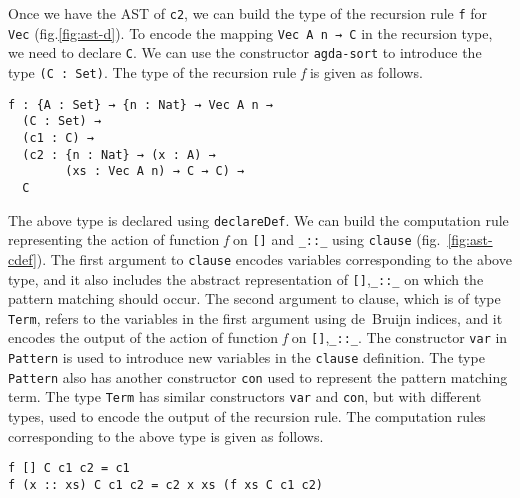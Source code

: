 \documentclass[sigplan,10pt]{acmart}
\begin{document}
Once we have the AST of {\tt c2}, we can build the type of the recursion rule {\tt f} for {\tt Vec} (fig.\ref{fig:ast-d}). To encode the mapping {\tt Vec A n → C} in the recursion type, we need to declare {\tt C}. We can use the constructor {\tt agda-sort} to introduce the type {\tt (C : Set)}. The type of the recursion rule \emph{f} is given as follows.

\begin{center}
\begingroup
\begin{BVerbatim}
f : {A : Set} → {n : Nat} → Vec A n → 
  (C : Set) → 
  (c1 : C) → 
  (c2 : {n : Nat} → (x : A) → 
        (xs : Vec A n) → C → C) → 
  C
\end{BVerbatim}
\endgroup
\end{center}

\normalsize


The above type is declared using {\tt declareDef}. We can build the computation rule representing the action of function \emph{f} on {\tt []} and {\tt \_::\_} using {\tt clause} (fig.~\ref{fig:ast-cdef}). The first argument to {\tt clause} encodes variables corresponding to the above type, and it also includes the abstract representation of {\tt []},{\tt \_::\_} on which the pattern matching should occur. The second argument to clause, which is of type {\tt Term}, refers to the variables in the first argument using de~Bruijn indices, and it encodes the output of the action of function \emph{f} on {\tt []},{\tt \_::\_}. The constructor {\tt var} in {\tt Pattern} is used to introduce new variables in the {\tt clause} definition. The type {\tt Pattern} also has another constructor {\tt con} used to represent the pattern matching term. The type {\tt Term} has similar constructors {\tt var} and {\tt con}, but with different types, used to encode the output of the recursion rule. The computation rules corresponding to the above type is given as follows.

\begin{center}
\begingroup
\begin{BVerbatim}
f [] C c1 c2 = c1
f (x :: xs) C c1 c2 = c2 x xs (f xs C c1 c2)
\end{BVerbatim}
\endgroup
\end{center}
\end{document}
